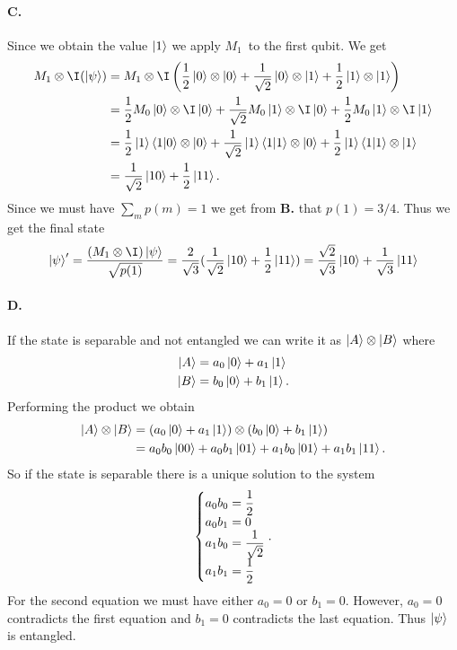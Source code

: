 \paragraph{C.} Since we obtain the value $\ket{1}$ we apply $M_1$ to the first qubit. We get
\begin{align*}
    M_1 \otimes \I (\ket{\psi}) &= M_1 \otimes \I \left( \frac{1}{2} \ket{0} \otimes \ket{0} + \frac{1}{\sqrt{2}} \ket{0} \otimes \ket{1} + \frac{1}{2} \ket{1} \otimes \ket{1} \right)\\
    &= \frac{1}{2} M_0\ket{0} \otimes \I \ket{0} + \frac{1}{\sqrt{2}} M_0 \ket{1} \otimes \I \ket{0} + \frac{1}{2} M_0 \ket{1} \otimes \I \ket{1}\\
    &= \frac{1}{2} \ket{1} \bra{1} \ket{0} \otimes \ket{0} + \frac{1}{\sqrt{2}} \ket{1} \bra{1} \ket{1} \otimes \ket{0} + \frac{1}{2} \ket{1} \bra{1} \ket{1} \otimes \ket{1}\\
    &= \frac{1}{\sqrt{2}} \ket{10} + \frac{1}{2} \ket{11}.
\end{align*}
Since we must have $\sum_m p(m) = 1$ we get from \textbf{B.} that $p(1) = 3/4$. Thus we get the final state
\begin{equation*}
    \ket{\psi}' = \frac{(M_1 \otimes \I) \ket{\psi}}{\sqrt{p(1)}} = \frac{2}{\sqrt{3}} (\frac{1}{\sqrt{2}} \ket{10} + \frac{1}{2} \ket{11}) = \frac{\sqrt{2}}{\sqrt{3}} \ket{10} + \frac{1}{\sqrt{3}} \ket{11}
\end{equation*}

\paragraph{D.} If the state is separable and not entangled we can write it as $\ket{A} \otimes \ket{B}$ where 
\begin{align*}
    \ket{A} &= a_0 \ket{0} + a_1 \ket{1}\\
    \ket{B} &= b_0 \ket{0} + b_1 \ket{1}.
\end{align*}
Performing the product we obtain
\begin{align*}
    \ket{A} \otimes \ket{B} &= (a_0 \ket{0} + a_1 \ket{1}) \otimes (b_0 \ket{0} + b_1 \ket{1}) \\
    &= a_0 b_0 \ket{00} + a_0 b_1 \ket{01} + a_1 b_0 \ket{01} + a_1 b_1 \ket{11}.
\end{align*}
So if the state is separable there is a unique solution to the system
\begin{equation*}
    \left\{\begin{array}{@{}>{\displaystyle}l@{}}
        a_0 b_0 = \frac{1}{2}\\
        a_0 b_1 = 0\\
        a_1 b_0 = \frac{1}{\sqrt{2}}\\
        a_1 b_1 = \frac{1}{2} 
    \end{array}\right..
\end{equation*}
For the second equation we must have either $a_0 = 0$ or $b_1 = 0$. However, $a_0 = 0$ contradicts the first equation and $b_1 = 0$ contradicts the last equation. Thus $\ket{\psi}$ is entangled.